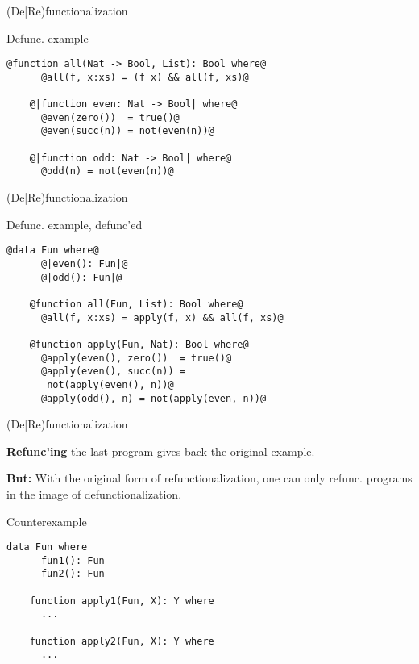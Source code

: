 \documentclass[xcolor=svgnames]{beamer}
\begin{document}
\begin{frame}[fragile]
  {(De|Re)functionalization}

  \begin{block}{Defunc. example}
    \begin{lstlisting}[style=base, gobble=4]
    @function all(Nat -> Bool, List): Bool where@
      @all(f, x:xs) = (f x) && all(f, xs)@

    @|function even: Nat -> Bool| where@
      @even(zero())  = true()@
      @even(succ(n)) = not(even(n))@

    @|function odd: Nat -> Bool| where@
      @odd(n) = not(even(n))@
    \end{lstlisting}
  \end{block}
  \pause
\end{frame}

\begin{frame}[fragile]
  {(De|Re)functionalization}

  \begin{block}{Defunc. example, defunc'ed}
    \begin{lstlisting}[style=base, gobble=4]
    @data Fun where@
      @|even(): Fun|@
      @|odd(): Fun|@

    @function all(Fun, List): Bool where@
      @all(f, x:xs) = apply(f, x) && all(f, xs)@

    @function apply(Fun, Nat): Bool where@
      @apply(even(), zero())  = true()@
      @apply(even(), succ(n)) = 
       not(apply(even(), n))@
      @apply(odd(), n) = not(apply(even, n))@
    \end{lstlisting}
  \end{block}
  \pause
\end{frame}

\begin{frame}[fragile]
  {(De|Re)functionalization}

  \textbf{Refunc'ing} the last program gives back the original example.

  \textbf{But:} With the original form of refunctionalization, one can only refunc. programs in the image of defunctionalization.

  \begin{block}{Counterexample}
    \begin{lstlisting}[escapechar=!]
    data Fun where
      fun1(): Fun
      fun2(): Fun

    function apply1(Fun, X): Y where
      ...
    
    function apply2(Fun, X): Y where
      ...
    \end{lstlisting}
  \end{block}
\end{frame}
\end{document}
